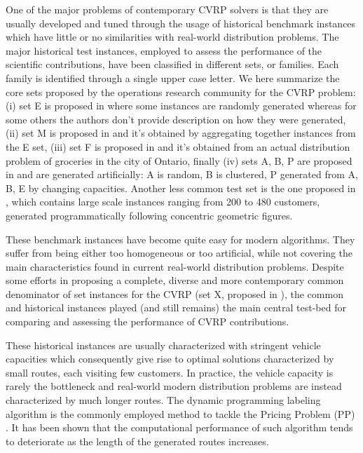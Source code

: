 One of the major problems of contemporary CVRP solvers
is that they are usually developed and tuned through the usage
of historical benchmark instances which
have little or no similarities with real-world distribution problems.
The major historical test instances,
employed to assess the performance of the scientific contributions,
have been classified in different sets, or families.
Each family is identified through a single upper case letter.
We here summarize the core sets proposed by the operations research community for the CVRP problem:
(i) set E is proposed in \textcite{dantzig1959, christofides1969, gaskell1967bases, gillett1974heuristic}
where some instances are randomly generated whereas for some others
the authors don't provide description on how they were generated,
(ii) set M is proposed in \textcite{christofides1979vehicle} and
it's obtained by aggregating together instances from the E set,
(iii) set F is proposed in \textcite{fisher1994} and it's obtained from an actual distribution problem of groceries in the city of Ontario,
finally (iv) sets A, B, P are proposed in \textcite{augerat1995} and are generated artificially: A is random, B is clustered, P generated from A, B, E by changing capacities.
Another less common test set is the one proposed in \textcite{golden1998impact},
which contains large scale instances ranging from 200 to 480 customers,
generated programmatically following concentric geometric figures.

These benchmark instances have become quite easy for modern algorithms.
They suffer from being either too homogeneous or too artificial,
while not covering the main characteristics found in current real-world distribution problems.
Despite some efforts in proposing a complete, diverse and more contemporary common denominator
of set instances for the CVRP (set X, proposed in \textcite{uchoa2017}),
the common and historical instances played (and still remains) the main central test-bed for comparing
and assessing the performance of CVRP contributions.

These historical instances are usually characterized with stringent vehicle capacities
which consequently give rise to optimal solutions characterized by small routes, each visiting few customers.
In practice, the vehicle capacity is rarely the bottleneck and
real-world modern distribution problems are instead characterized by much longer routes.
The dynamic programming labeling algorithm
\parencite{desrochers1992,feillet2004}
is the commonly employed method to tackle the Pricing Problem (PP) \parencite{gutierrez-jarpa2010, archetti2011, bettinelli2011, contardo2014, contardo2015, pecin2017new, pecin2017improved, pessoa2020generic}.
It has been shown that the computational performance of such algorithm
tends to deteriorate as the length of the generated routes increases.

